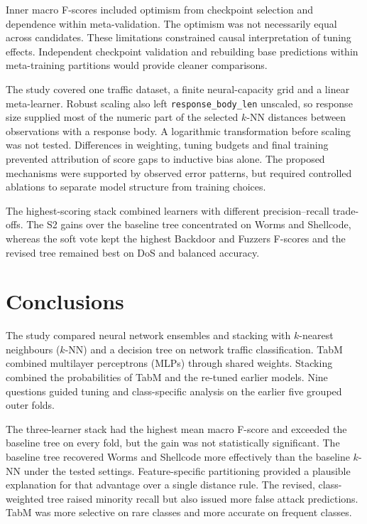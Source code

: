 \documentclass[conference]{IEEEtran}
\newcommand{\knn}{\mbox{$k$-NN}}
\begin{document}
Inner macro F-scores included optimism from checkpoint selection and dependence within meta-validation. The optimism was not necessarily equal across candidates. These limitations constrained causal interpretation of tuning effects. Independent checkpoint validation and rebuilding base predictions within meta-training partitions would provide cleaner comparisons.

The study covered one traffic dataset, a finite neural-capacity grid and a linear meta-learner. Robust scaling also left \texttt{response\_body\_len} unscaled, so response size supplied most of the numeric part of the selected \knn{} distances between observations with a response body. A logarithmic transformation before scaling was not tested. Differences in weighting, tuning budgets and final training prevented attribution of score gaps to inductive bias alone. The proposed mechanisms were supported by observed error patterns, but required controlled ablations to separate model structure from training choices.

The highest-scoring stack combined learners with different precision--recall trade-offs. The S2 gains over the baseline tree concentrated on Worms and Shellcode, whereas the soft vote kept the highest Backdoor and Fuzzers F-scores and the revised tree remained best on DoS and balanced accuracy.

\section{Conclusions}
The study compared neural network ensembles and stacking with $k$-nearest neighbours (\knn) and a decision tree on network traffic classification. TabM combined multilayer perceptrons (MLPs) through shared weights. Stacking combined the probabilities of TabM and the re-tuned earlier models. Nine questions guided tuning and class-specific analysis on the earlier five grouped outer folds.

The three-learner stack had the highest mean macro F-score and exceeded the baseline tree on every fold, but the gain was not statistically significant. The baseline tree recovered Worms and Shellcode more effectively than the baseline \knn{} under the tested settings. Feature-specific partitioning provided a plausible explanation for that advantage over a single distance rule. The revised, class-weighted tree raised minority recall but also issued more false attack predictions. TabM was more selective on rare classes and more accurate on frequent classes.
\end{document}
